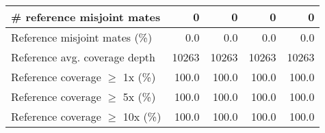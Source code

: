 \documentclass[12pt,a4paper]{article}
\begin{document}
\begin{table}[ht]
\begin{center}
\begin{tabular}{|l*{4}{|r}|}
\# reference misjoint mates & 0 & 0 & 0 & 0 \\ \hline
Reference misjoint mates (\%) & 0.0 & 0.0 & 0.0 & 0.0 \\ \hline
Reference avg. coverage depth & 10263 & 10263 & 10263 & 10263 \\ \hline
Reference coverage $\geq$ 1x (\%) & 100.0 & 100.0 & 100.0 & 100.0 \\ \hline
Reference coverage $\geq$ 5x (\%) & 100.0 & 100.0 & 100.0 & 100.0 \\ \hline
Reference coverage $\geq$ 10x (\%) & 100.0 & 100.0 & 100.0 & 100.0 \\ \hline
\end{tabular}
\end{center}
\end{table}
\end{document}
